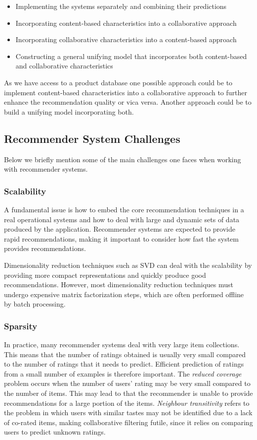 \begin{itemize}
\item Implementing the systems separately and combining their predictions
\item Incorporating content-based characteristics into a collaborative approach
\item Incorporating collaborative characteristics into a content-based approach
\item Constructing a general unifying model that incorporates both
content-based and collaborative characteristics
\end{itemize}

As we have access to a product database one possible approach could be to implement
content-based characteristics into a collaborative approach to further enhance the
recommendation quality or vica versa. Another approach could be to build a unifying model incorporating both.

\subsection{Recommender System Challenges}

Below we briefly mention some of the main challenges one faces when working
with recommender systems.

\subsubsection{Scalability}

A fundamental issue is how to embed the core recommendation techniques in a real operational
systems and how to deal with large and dynamic sets of data produced by the application.
Recommender systems are expected to provide rapid recommendations, making it important
to consider how fast the system provides recommendations.

Dimensionality reduction techniques such as SVD can deal with the scalability by providing
more compact representations and quickly produce good recommendations. However, most dimensionality reduction
techniques must undergo expensive matrix factorization steps, which are often
performed offline by batch processing.

\subsubsection{Sparsity}

In practice, many recommender systems deal with very large item collections.
This means that the number of ratings obtained is usually very small compared to the
number of ratings that it needs to predict. Efficient prediction of ratings from a small
number of examples is therefore important. The \emph{reduced coverage} problem
occurs when the number of users' rating may be very small compared to the number of items.
This may lead to that the recommender is unable to provide recommendations for a large
portion of the items. \emph{Neighbour transitivity} refers to the problem in which users
with similar tastes may not be identified due to a lack of co-rated items, making
collaborative filtering futile, since it relies on comparing users to predict unknown ratings.

